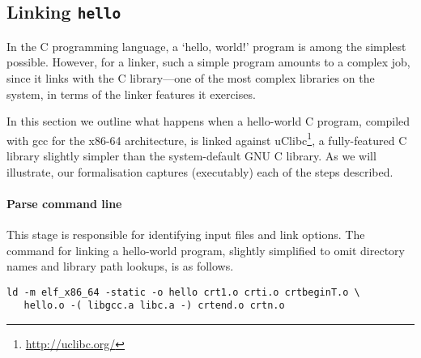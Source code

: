 \documentclass[preprint,10pt]{sigplanconf-pldi16}
\begin{document}
\subsection{Linking \texttt{hello}}
\label{sec:hello}

In the C programming language, a `hello, world!' program is among the simplest possible.
However, for a linker, such a simple program amounts to a complex job,
since it links with the C library---one of the most complex libraries on the system,
in terms of the linker features it exercises.

In this section we outline what happens when a hello-world C program, compiled with \textsf{gcc} 
for the x86-64 architecture,
is linked against uClibc\footnote{\url{http://uclibc.org/}}, 
a fully-featured C library slightly simpler than the system-default GNU C library.
As we will illustrate, our formalisation captures (executably) each of the steps described.

\paragraph{Parse command line}
This stage is responsible for identifying input files and link options.
The command for linking a hello-world program, slightly simplified to omit directory names and library path lookups, 
is as follows.

\begin{lstlisting}[language=plain,basicstyle=\footnotesize\ttfamily]
ld -m elf_x86_64 -static -o hello crt1.o crti.o crtbeginT.o \
   hello.o -( libgcc.a libc.a -) crtend.o crtn.o 
\end{lstlisting}
\end{document}
